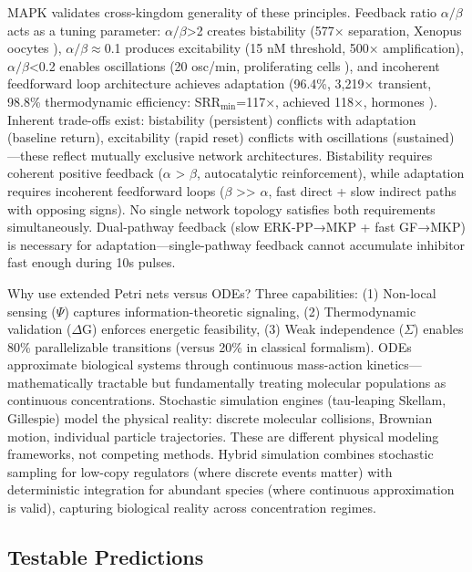 \documentclass[twocolumn,11pt]{article}
\begin{document}
MAPK validates cross-kingdom generality of these principles. Feedback ratio $\alpha/\beta$ acts as a tuning parameter: $\alpha/\beta$>2 creates bistability (577× separation, Xenopus oocytes \citep{ferrell2009}), $\alpha/\beta$$\approx$0.1 produces excitability (15 nM threshold, 500× amplification), $\alpha/\beta$<0.2 enables oscillations (20 osc/min, proliferating cells \citep{shankaran2009}), and incoherent feedforward loop architecture achieves adaptation (96.4\%, 3,219× transient, 98.8\% thermodynamic efficiency: SRR$_{\text{min}}$=117×, achieved 118×, hormones \citep{amit2007}). Inherent trade-offs exist: bistability (persistent) conflicts with adaptation (baseline return), excitability (rapid reset) conflicts with oscillations (sustained)—these reflect mutually exclusive network architectures. Bistability requires coherent positive feedback ($\alpha$ > $\beta$, autocatalytic reinforcement), while adaptation requires incoherent feedforward loops ($\beta$ >> $\alpha$, fast direct + slow indirect paths with opposing signs). No single network topology satisfies both requirements simultaneously. Dual-pathway feedback (slow ERK-PP→MKP + fast GF→MKP) is necessary for adaptation—single-pathway feedback cannot accumulate inhibitor fast enough during 10s pulses.

Why use extended Petri nets versus ODEs? Three capabilities: (1) Non-local sensing ($\Psi$) captures information-theoretic signaling, (2) Thermodynamic validation ($\Delta$G) enforces energetic feasibility, (3) Weak independence ($\Sigma$) enables 80\% parallelizable transitions (versus 20\% in classical formalism). ODEs approximate biological systems through continuous mass-action kinetics—mathematically tractable but fundamentally treating molecular populations as continuous concentrations. Stochastic simulation engines (tau-leaping Skellam, Gillespie) model the physical reality: discrete molecular collisions, Brownian motion, individual particle trajectories. These are different physical modeling frameworks, not competing methods. Hybrid simulation combines stochastic sampling for low-copy regulators (where discrete events matter) with deterministic integration for abundant species (where continuous approximation is valid), capturing biological reality across concentration regimes.

\subsection*{Testable Predictions}
\end{document}
